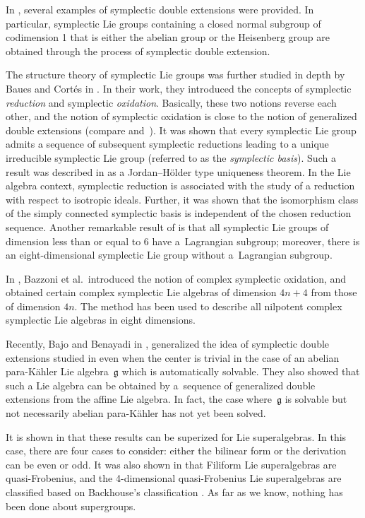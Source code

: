 \documentclass[pdftex]{sigma}
\numberwithin{equation}{section}
\begin{document}
In \cite{DM1}, several examples of symplectic double extensions were provided. In particular, symplectic Lie groups containing a closed normal subgroup of codimension 1 that is either the abelian group or the Heisenberg group are obtained through the process of symplectic double extension.

The structure theory of symplectic Lie groups was further studied in depth by Baues and Cort\'es in \cite{BC}. In their work, they introduced the concepts of symplectic {\it reduction} and symplectic {\it oxidation}. Basically, these two notions reverse each other, and the notion of symplectic oxidation is close to the notion of generalized double extensions (compare \cite[Section 2.3]{BC} and~\cite[Th\'eor\`eme~2.7]{DM1}). It was shown that every symplectic Lie group admits a sequence of subsequent symplectic reductions leading to a unique irreducible symplectic Lie group (referred to as the {\it symplectic basis}). Such a result was described in \cite{BC} as a Jordan--H\"older type uniqueness theorem. In the Lie algebra context, symplectic reduction is associated with the study of a reduction with respect to isotropic ideals. Further, it was shown that the isomorphism class of the simply connected symplectic basis is independent of the chosen reduction sequence. Another remarkable result of \cite{BC} is that all symplectic Lie groups of dimension less than or equal to 6 have a~Lagrangian subgroup; moreover, there is an eight-dimensional symplectic Lie group without a~Lagrangian subgroup.

In \cite{BFLM}, Bazzoni et al.\ introduced the notion of complex symplectic oxidation, and obtained certain complex symplectic Lie algebras of dimension $4n +4$ from those of dimension $4n$. The method has been used to describe all nilpotent complex symplectic Lie algebras in eight dimensions.

Recently, Bajo and Benayadi in \cite{BaBe}, generalized the idea of symplectic double extensions studied in \cite{DM2} even when the center is trivial in the case of an abelian para-K\"ahler Lie algebra~$\mathfrak{g}$ which is automatically solvable. They also showed that such a Lie algebra can be obtained by a~sequence of generalized double extensions from the affine Lie algebra. In fact, the case where~$\mathfrak{g}$ is solvable but not necessarily abelian para-K\"ahler has not yet been solved.

It is shown in \cite{BM} that these results can be superized for Lie superalgebras. In this case, there are four cases to consider: either the bilinear form or the derivation can be even or odd. It was also shown in \cite{BM} that Filiform Lie superalgebras are quasi-Frobenius, and the 4-dimensional quasi-Frobenius Lie superalgebras are classified based on Backhouse's classification \cite{Ba}. As far as we know, nothing has been done about supergroups.
\end{document}

